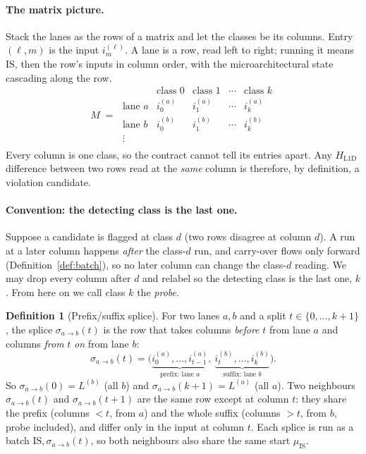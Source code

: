 \documentclass[11pt]{article}
\theoremstyle{definition}
\newtheorem{definition}{Definition}
\theoremstyle{plain}
\newcommand{\IS}{\mathrm{IS}}
\newcommand{\HL}{H_{\mathrm{L1D}}}
\newcommand{\lane}[1]{L^{(#1)}}
\newcommand{\inp}[2]{i_{#1}^{(#2)}}
\newcommand{\dprobe}{d}
\begin{document}
\paragraph{The matrix picture.}
Stack the lanes as the rows of a matrix and let the classes be its columns. Entry
$(\ell,m)$ is the input $\inp{m}{\ell}$. A lane is a row, read left to right; running it
means $\IS$, then the row's inputs in column order, with the microarchitectural state
cascading along the row.
\[
  M \;=\;
  \begin{array}{c|cccc}
     & \text{class }0 & \text{class }1 & \cdots & \text{class }k \\ \hline
    \text{lane }a & \inp{0}{a} & \inp{1}{a} & \cdots & \inp{k}{a} \\
    \text{lane }b & \inp{0}{b} & \inp{1}{b} & \cdots & \inp{k}{b} \\
    \vdots        &            &            &        &            \\
  \end{array}
\]
Every column is one class, so the contract cannot tell its entries apart. Any $\HL$
difference between two rows read at the \emph{same} column is therefore, by definition,
a violation candidate.

\paragraph{Convention: the detecting class is the last one.}
Suppose a candidate is flagged at class $\dprobe$ (two rows disagree at column
$\dprobe$). A run at a later column happens \emph{after} the class-$\dprobe$ run, and
carry-over flows only forward (Definition~\ref{def:batch}), so no later column can
change the class-$\dprobe$ reading. We may drop every column after $\dprobe$ and relabel
so the detecting class is the last one, $k$. From here on we call class $k$ the
\emph{probe}.

\begin{definition}[Prefix/suffix splice]
\label{def:toggle}
For two lanes $a,b$ and a split $t\in\{0,\dots,k+1\}$, the splice $\sigma_{a\to b}(t)$
is the row that takes columns \emph{before} $t$ from lane $a$ and columns \emph{from}
$t$ \emph{on} from lane $b$:
\[
  \sigma_{a\to b}(t)=\bigl(\underbrace{\inp{0}{a},\dots,\inp{t-1}{a}}_{\text{prefix: lane }a},\
                           \underbrace{\inp{t}{b},\dots,\inp{k}{b}}_{\text{suffix: lane }b}\bigr).
\]
So $\sigma_{a\to b}(0)=\lane{b}$ (all $b$) and $\sigma_{a\to b}(k+1)=\lane{a}$ (all
$a$). Two neighbours $\sigma_{a\to b}(t)$ and $\sigma_{a\to b}(t+1)$ are the same row
except at column $t$: they share the prefix (columns $<t$, from $a$) and the whole
suffix (columns $>t$, from $b$, probe included), and differ only in the input at column
$t$. Each splice is run as a batch $\IS,\sigma_{a\to b}(t)$, so both neighbours also
share the same start $\mu_\IS$.
\end{definition}
\end{document}
